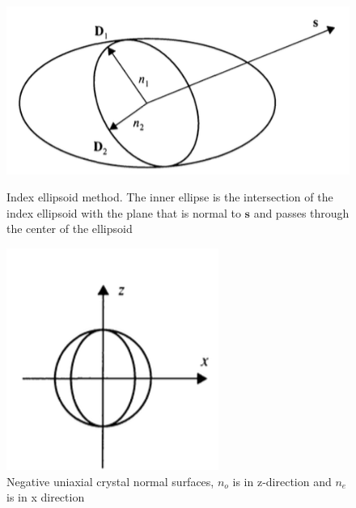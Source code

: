\documentclass[thesis]{deutez}
\begin{document}
    \begin{figure}[htbp]
        \centering
        \begin{minipage}{0.45\textwidth}
            \centering
            \includegraphics[width=\linewidth]{indexEllipsoidMethod.png}
            \vspace{0.3cm}
            \caption{Index ellipsoid method. The inner ellipse is the intersection of the index ellipsoid with the plane that is normal to $\mathbf{s}$ and passes through the center of the ellipsoid \cite{2}}
            \label{fig:left}
        \end{minipage}
        \hspace{1.5cm}
        \begin{minipage}{0.25\textwidth}
            \centering
            \includegraphics[width=1\linewidth]{negativeUniaxialCrystal.png}
            \caption{Negative uniaxial crystal normal surfaces, $n_o$ is in z-direction and $n_e$ is in x direction \cite{2} }
            \label{fig:right}
        \end{minipage}
    \end{figure}
\end{document}
